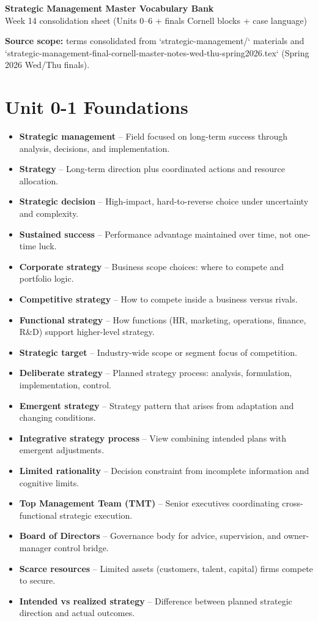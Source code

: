 \documentclass[10pt,a4paper]{article}
\newcommand{\vocab}[2]{\item \textbf{\textcolor{pinkmain}{#1}} -- #2}
\begin{document}
\begin{center}
{\Large\bfseries\color{pinkdark} Strategic Management Master Vocabulary Bank}\\
{\small\color{textdark} Week 14 consolidation sheet (Units 0--6 + finals Cornell blocks + case language)}
\end{center}

\colorbox{pinksoft}{\parbox{\dimexpr\linewidth-2\fboxsep}{\small
\textbf{Source scope:} terms consolidated from `strategic-management/` materials and `strategic-management-final-cornell-master-notes-wed-thu-spring2026.tex` (Spring 2026 Wed/Thu finals).}}

\section*{Unit 0-1 Foundations}
\begin{itemize}
\vocab{Strategic management}{Field focused on long-term success through analysis, decisions, and implementation.}
\vocab{Strategy}{Long-term direction plus coordinated actions and resource allocation.}
\vocab{Strategic decision}{High-impact, hard-to-reverse choice under uncertainty and complexity.}
\vocab{Sustained success}{Performance advantage maintained over time, not one-time luck.}
\vocab{Corporate strategy}{Business scope choices: where to compete and portfolio logic.}
\vocab{Competitive strategy}{How to compete inside a business versus rivals.}
\vocab{Functional strategy}{How functions (HR, marketing, operations, finance, R\&D) support higher-level strategy.}
\vocab{Strategic target}{Industry-wide scope or segment focus of competition.}
\vocab{Deliberate strategy}{Planned strategy process: analysis, formulation, implementation, control.}
\vocab{Emergent strategy}{Strategy pattern that arises from adaptation and changing conditions.}
\vocab{Integrative strategy process}{View combining intended plans with emergent adjustments.}
\vocab{Limited rationality}{Decision constraint from incomplete information and cognitive limits.}
\vocab{Top Management Team (TMT)}{Senior executives coordinating cross-functional strategic execution.}
\vocab{Board of Directors}{Governance body for advice, supervision, and owner-manager control bridge.}
\vocab{Scarce resources}{Limited assets (customers, talent, capital) firms compete to secure.}
\vocab{Intended vs realized strategy}{Difference between planned strategic direction and actual outcomes.}
\end{itemize}
\end{document}
